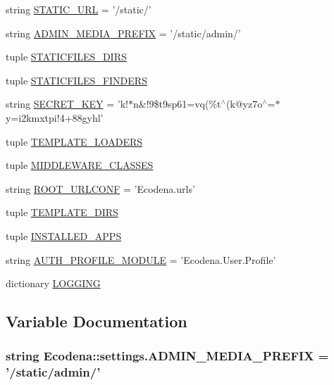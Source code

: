 \begin{DoxyCompactItemize}
\item 
string \hyperlink{namespace_ecodena_1_1settings_a9e3bf1c868b8e0610a556328ebbea29b}{STATIC\_\-URL} = '/static/'
\item 
string \hyperlink{namespace_ecodena_1_1settings_ac913803e324cd61bb8e654cafb397ddf}{ADMIN\_\-MEDIA\_\-PREFIX} = '/static/admin/'
\item 
tuple \hyperlink{namespace_ecodena_1_1settings_ada22dfac93df1b81c84139ab6f83b7ba}{STATICFILES\_\-DIRS}
\item 
tuple \hyperlink{namespace_ecodena_1_1settings_a687e8077a78925e11f4051c4bee690dc}{STATICFILES\_\-FINDERS}
\item 
string \hyperlink{namespace_ecodena_1_1settings_a4debebea5e8b517ae267150eca535ff7}{SECRET\_\-KEY} = 'k!$\ast$n\&!9\$t9sp61=vq(\%t$^\wedge$(k@yz7o$^\wedge$=$\ast$y=i2kmxtpi!4+88gyhl'
\item 
tuple \hyperlink{namespace_ecodena_1_1settings_ac0ae09ebc4a08171087c635ef78bf07b}{TEMPLATE\_\-LOADERS}
\item 
tuple \hyperlink{namespace_ecodena_1_1settings_a9877a888d62dba39bb7e8749c7f41f76}{MIDDLEWARE\_\-CLASSES}
\item 
string \hyperlink{namespace_ecodena_1_1settings_a961361114e369d434f9beba128ae2a60}{ROOT\_\-URLCONF} = 'Ecodena.urls'
\item 
tuple \hyperlink{namespace_ecodena_1_1settings_a4dabd274b6d22e33a380f7a03e124b9f}{TEMPLATE\_\-DIRS}
\item 
tuple \hyperlink{namespace_ecodena_1_1settings_ac8fdbd1ee538838abd943b2a5ca6dda0}{INSTALLED\_\-APPS}
\item 
string \hyperlink{namespace_ecodena_1_1settings_a7ffd079a2ae998fcd397ee29a253cea4}{AUTH\_\-PROFILE\_\-MODULE} = 'Ecodena.User.Profile'
\item 
dictionary \hyperlink{namespace_ecodena_1_1settings_a059398c196fa49b419335d3b542a7d6a}{LOGGING}
\end{DoxyCompactItemize}


\subsection{Variable Documentation}
\hypertarget{namespace_ecodena_1_1settings_ac913803e324cd61bb8e654cafb397ddf}{
\subsubsection[{ADMIN\_\-MEDIA\_\-PREFIX}]{\setlength{\rightskip}{0pt plus 5cm}string {\bf Ecodena::settings.ADMIN\_\-MEDIA\_\-PREFIX} = '/static/admin/'}}
\label{d1/d62/namespace_ecodena_1_1settings_ac913803e324cd61bb8e654cafb397ddf}


